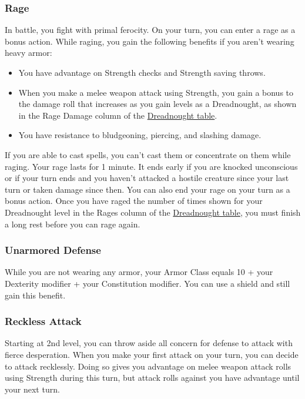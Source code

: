 \subsubsection{Rage}\label{dreadnought-feature-rage}

In battle, you fight with primal ferocity. On your turn, you can enter a
rage as a bonus action. While raging, you gain the following benefits if
you aren't wearing heavy armor:

\begin{itemize}
\item
  You have advantage on Strength checks and Strength saving throws.
\item
  When you make a melee weapon attack using Strength, you gain a bonus
  to the damage roll that increases as you gain levels as a Dreadnought,
  as shown in the Rage Damage column of the
  \hyperref[dreadnought-table]{Dreadnought table}.
\item
  You have resistance to bludgeoning, piercing, and slashing damage.
\end{itemize}

If you are able to cast spells, you can't cast them or concentrate on
them while raging. Your rage lasts for 1 minute. It ends early if you
are knocked unconscious or if your turn ends and you haven't attacked a
hostile creature since your last turn or taken damage since then. You
can also end your rage on your turn as a bonus action. Once you have
raged the number of times shown for your Dreadnought level in the Rages
column of the \hyperref[dreadnought-table]{Dreadnought table}, you must
finish a long rest before you can rage again.

\subsubsection{Unarmored
Defense}\label{dreadnought-feature-unarmored-defense}

While you are not wearing any armor, your Armor Class equals 10 + your
Dexterity modifier + your Constitution modifier. You can use a shield
and still gain this benefit.

\subsubsection{Reckless
Attack}\label{dreadnought-feature-reckless-attack}

Starting at 2nd level, you can throw aside all concern for defense to
attack with fierce desperation. When you make your first attack on your
turn, you can decide to attack recklessly. Doing so gives you advantage
on melee weapon attack rolls using Strength during this turn, but attack
rolls against you have advantage until your next turn.

